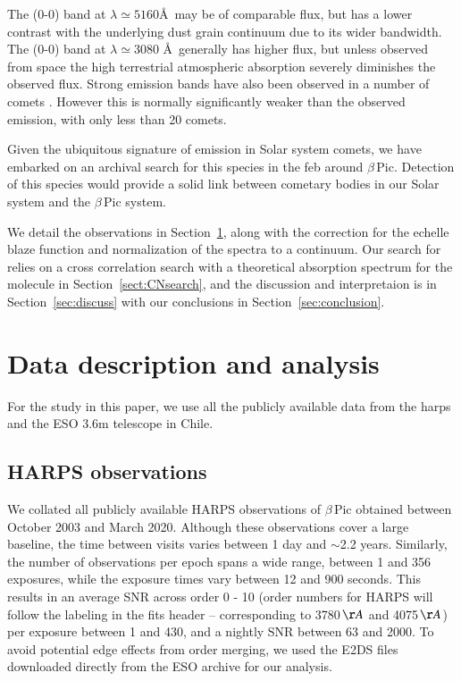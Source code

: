 \documentclass{aa}
\newcommand{\bp}{$\beta$\,Pic}
\begin{document}
The  (0-0) band at $\lambda\simeq 5160$\AA \ may be of comparable flux, but has a lower contrast with the underlying dust grain continuum due to its wider bandwidth.
%
The  (0-0) band at $\lambda\simeq 3080$ \AA \ generally has higher flux, but unless observed from space the high terrestrial atmospheric absorption severely diminishes the observed flux.
%
Strong  emission bands have also been observed in a number of comets \citep[the strongest ones are the (3-0) and (2-0) $\mathrm{A^2\Pi-X^2\Sigma}$; ][]{Biver2018}.
%
However this is normally significantly weaker than the observed  emission, with only less than 20 comets.

Given the ubiquitous signature of  emission in Solar system comets, we have embarked on an archival search for this species in the \ac{feb} around \bp{}.
%
Detection of this species would provide a solid link between cometary bodies in our Solar system and the \bp{} system.

We detail the observations in Section~\ref{sec:data}, along with the correction for the echelle blaze function and normalization of the spectra to a continuum.
%
Our search for  relies on a cross correlation search with a theoretical absorption spectrum for the molecule in Section~\ref{sect:CNsearch}, and the discussion and interpretaion is in Section~\ref{sec:discuss} with our conclusions in Section~\ref{sec:conclusion}.

\section{Data description and analysis}\label{sec:data}

For the study in this paper, we use all the publicly available data from the \ac{harps} and the ESO 3.6m telescope in Chile.
%

\subsection{HARPS observations}

We collated all publicly available HARPS observations of \bp{} obtained between October 2003 and March 2020.
%
Although these observations cover a large baseline, the time between visits varies between 1 day and $\sim$2.2 years.
%
Similarly, the number of observations per epoch spans a wide range, between 1 and 356 exposures, while the exposure times vary between 12 and 900 seconds. This results in an average SNR across order 0 - 10 (order numbers for HARPS will follow the labeling in the fits header -- corresponding to 3780\,$\AA$ and 4075\,$\AA$) per exposure between 1 and 430, and a nightly SNR between 63 and 2000.
%
To avoid potential edge effects from order merging,  we used the E2DS files downloaded directly from the ESO archive for our analysis.
\end{document}
